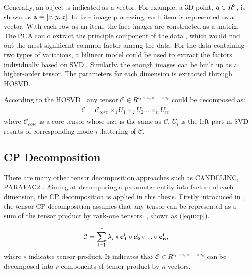 	Generally, an object is indicated as a vector. For example,
	a 3D point, ${\bf a} \in R^{3}$, is shown as ${\bf a} = [x,y,z]$.
	In face image processing, each item is represented as a vector. 
	With each row as an item, the face images are constructed as a 
	matrix. The PCA could extract the
	principle component of the data \cite{EigenFace91,EigenFace97}, which would
	find out the most significant common factor among the data.
	For the data containing two types of variations, a bilinear 
	model could be used to extract the factors individually based
	on SVD \cite{Bilinear97,Bilinear00,Bilinear04}.
	Similarly, the enough images can be built up as a higher-order
	tensor. The parameters for each dimension is extracted through HOSVD.

	According to the HOSVD \cite{Lathauwer00,Lathauwer_rank}, any 
	tensor $\mathcal{C} \in R^{i_1 \times i_2 \times ... \times 
	i_n}$ could be decomposed as:
	\begin{align}
		\label{equ:hosvd}
		\begin{split}
			\mathcal{C} = \mathcal{C}_{core} \times_1 U_1 \times_2 U_2 ... \times_n U_n,
		\end{split}
	\end{align}
	where $\mathcal{C}_{core}$ is a core tensor whose size is the same as $\mathcal{C}$, $U_i$ is the left part in SVD results 
	of corresponding mode-$i$ flattening of $\mathcal{C}$.

	\subsection{CP Decomposition}
	There are many other tensor decomposition approaches such as CANDELINC, 
	PARAFAC2 \cite{Candelinc80,Parafac72}. Aiming at decomposing a parameter
	entity into factors of each dimension, the CP decomposition is applied
	in this thesis.
	Firstly introduced in \cite{CP27,CP27_2},
	the tensor CP decomposition assumes that any 
    tensor can be represented as a sum of the tensor product by rank-one tensors.
    \cite{Lathauwer_rank}, shown as (\ref{equ:cp}).

    \begin{equation}
	      \label{equ:cp}
	      \begin{aligned}
	        \mathcal{C} = \sum_{i=1}^{r}\lambda_i * {\bf c_1^i} \circ {\bf c_2^i} \circ...\circ {\bf c_n^i},  
	      \end{aligned}
    \end{equation}
    where $\circ$ indicates tensor product. It indicates that $\mathcal{C} \in R^{i_1 \times i_2 \times ... \times i_n}$ 
    can be decomposed into $r$ components of tensor product by $n$ vectors.

